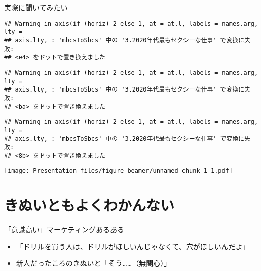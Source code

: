 \documentclass[ignorenonframetext,]{beamer}
\providecommand{\tightlist}{%
  \setlength{\itemsep}{0pt}\setlength{\parskip}{0pt}}
\begin{document}
\begin{frame}[fragile]{実際に聞いてみたい}
\begin{verbatim}
## Warning in axis(if (horiz) 2 else 1, at = at.l, labels = names.arg, lty =
## axis.lty, : 'mbcsToSbcs' 中の '3.2020年代最もセクシーな仕事' で変換に失敗:
## <e4> をドットで置き換えました
\end{verbatim}

\begin{verbatim}
## Warning in axis(if (horiz) 2 else 1, at = at.l, labels = names.arg, lty =
## axis.lty, : 'mbcsToSbcs' 中の '3.2020年代最もセクシーな仕事' で変換に失敗:
## <ba> をドットで置き換えました
\end{verbatim}

\begin{verbatim}
## Warning in axis(if (horiz) 2 else 1, at = at.l, labels = names.arg, lty =
## axis.lty, : 'mbcsToSbcs' 中の '3.2020年代最もセクシーな仕事' で変換に失敗:
## <8b> をドットで置き換えました
\end{verbatim}

\texttt{[image: Presentation\_files/figure-beamer/unnamed-chunk-1-1.pdf]}

\end{frame}

\section{きぬいともよくわかんない}

\begin{frame}{「意識高い」マーケティングあるある}

\begin{itemize}
\tightlist
\item
  「ドリルを買う人は、ドリルがほしいんじゃなくて、穴がほしいんだよ」
\end{itemize}

\begin{itemize}
\tightlist
\item
  新人だったころのきぬいと「そう\ldots{}\ldots{}（無関心）」
\end{itemize}

\end{frame}
\end{document}
